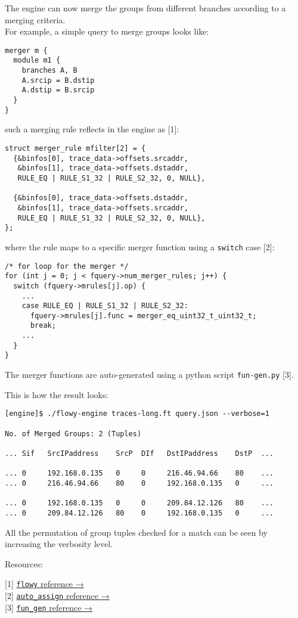 The engine can now merge the groups from different branches according to
a merging criteria.\\For example, a simple query to merge groups looks
like:

\begin{lstlisting}
merger m {
  module m1 {
    branches A, B
    A.srcip = B.dstip
    A.dstip = B.srcip
  }
}
\end{lstlisting}

such a merging rule reflects in the engine as {[}1{]}:

\begin{lstlisting}
struct merger_rule mfilter[2] = {
  {&binfos[0], trace_data->offsets.srcaddr, 
   &binfos[1], trace_data->offsets.dstaddr, 
   RULE_EQ | RULE_S1_32 | RULE_S2_32, 0, NULL},

  {&binfos[0], trace_data->offsets.dstaddr, 
   &binfos[1], trace_data->offsets.srcaddr,
   RULE_EQ | RULE_S1_32 | RULE_S2_32, 0, NULL},
};
\end{lstlisting}

where the rule maps to a specific merger function using a
\lstinline!switch! case {[}2{]}:

\begin{lstlisting}
/* for loop for the merger */
for (int j = 0; j < fquery->num_merger_rules; j++) {
  switch (fquery->mrules[j].op) {
    ...
    case RULE_EQ | RULE_S1_32 | RULE_S2_32:
      fquery->mrules[j].func = merger_eq_uint32_t_uint32_t;
      break;
    ...
  }
}    
\end{lstlisting}

The merger functions are auto-generated using a python script
\lstinline!fun-gen.py! {[}3{]}.

This is how the result looks:

\begin{lstlisting}
[engine]$ ./flowy-engine traces-long.ft query.json --verbose=1

No. of Merged Groups: 2 (Tuples)

... Sif   SrcIPaddress    SrcP  DIf   DstIPaddress    DstP  ... 

... 0     192.168.0.135   0     0     216.46.94.66    80    ... 
... 0     216.46.94.66    80    0     192.168.0.135   0     ... 

... 0     192.168.0.135   0     0     209.84.12.126   80    ... 
... 0     209.84.12.126   80    0     192.168.0.135   0     ... 
\end{lstlisting}

All the permutation of group tuples checked for a match can be seen by
increasing the verbosity level.

Resources:

{[}1{]}
\href{http://dl.dropbox.com/u/500389/mthesis/docs-engine/html/flowy\_8c.html}{\lstinline!flowy!
reference →}\\{[}2{]}
\href{http://dl.dropbox.com/u/500389/mthesis/docs-engine/html/auto\_\_assign\_8c.html}{\lstinline!auto_assign!
reference →}\\{[}3{]}
\href{http://dl.dropbox.com/u/500389/mthesis/docs-engine/html/namespacefun\_\_gen.html}{\lstinline!fun_gen!
reference →}
